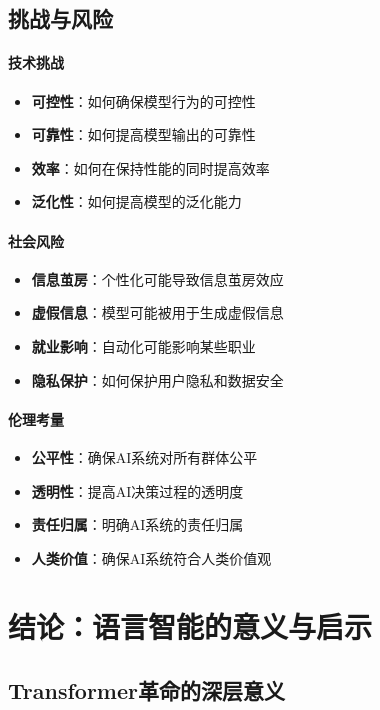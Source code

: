 \subsection{挑战与风险}

\paragraph{技术挑战}
\begin{itemize}
\item \textbf{可控性}：如何确保模型行为的可控性
\item \textbf{可靠性}：如何提高模型输出的可靠性
\item \textbf{效率}：如何在保持性能的同时提高效率
\item \textbf{泛化性}：如何提高模型的泛化能力
\end{itemize}

\paragraph{社会风险}
\begin{itemize}
\item \textbf{信息茧房}：个性化可能导致信息茧房效应
\item \textbf{虚假信息}：模型可能被用于生成虚假信息
\item \textbf{就业影响}：自动化可能影响某些职业
\item \textbf{隐私保护}：如何保护用户隐私和数据安全
\end{itemize}

\paragraph{伦理考量}
\begin{itemize}
\item \textbf{公平性}：确保AI系统对所有群体公平
\item \textbf{透明性}：提高AI决策过程的透明度
\item \textbf{责任归属}：明确AI系统的责任归属
\item \textbf{人类价值}：确保AI系统符合人类价值观
\end{itemize}

\section{结论：语言智能的意义与启示}

\subsection{Transformer革命的深层意义}

